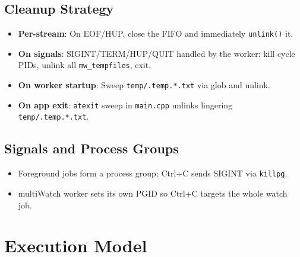 \documentclass[11pt,a4paper]{article}
\begin{document}
\subsection{Cleanup Strategy}
\begin{itemize}[leftmargin=*]
  \item \textbf{Per-stream}: On EOF/HUP, close the FIFO and immediately \texttt{unlink()} it.
  \item \textbf{On signals}: SIGINT/TERM/HUP/QUIT handled by the worker: kill cycle PIDs, unlink all \texttt{mw\_tempfiles}, exit.
  \item \textbf{On worker startup}: Sweep \texttt{temp/.temp.*.txt} via glob and unlink.
  \item \textbf{On app exit}: \texttt{atexit} sweep in \texttt{main.cpp} unlinks lingering \texttt{temp/.temp.*.txt}.
\end{itemize}

\subsection{Signals and Process Groups}
\begin{itemize}[leftmargin=*]
  \item Foreground jobs form a process group; Ctrl+C sends SIGINT via \texttt{killpg}.
  \item multiWatch worker sets its own PGID so Ctrl+C targets the whole watch job.
\end{itemize}

\section{Execution Model}
\end{document}
